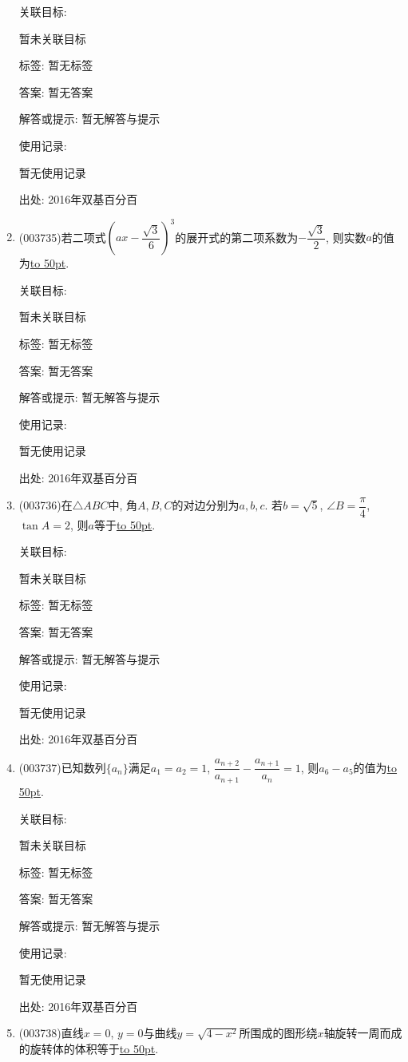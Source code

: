 \documentclass[10pt,a4paper]{article}
\newcommand{\blank}[1]{\underline{\hbox to #1pt{}}}
\begin{document}
\begin{enumerate}[1.]
关联目标:

暂未关联目标



标签: 暂无标签

答案: 暂无答案

解答或提示: 暂无解答与提示

使用记录:

暂无使用记录


出处: 2016年双基百分百
\item { (003735)}若二项式$\left(ax-\dfrac{\sqrt{3}}{6}\right)^3$的展开式的第二项系数为$-\dfrac{\sqrt{3}}{2}$, 则实数$a$的值为\blank{50}.


关联目标:

暂未关联目标



标签: 暂无标签

答案: 暂无答案

解答或提示: 暂无解答与提示

使用记录:

暂无使用记录


出处: 2016年双基百分百
\item { (003736)}在$\triangle ABC$中, 角$A,B,C$的对边分别为$a,b,c$. 若$b=\sqrt{5}$, $\angle B=\dfrac{\pi}{4}$, $\tan A=2$, 则$a$等于\blank{50}.


关联目标:

暂未关联目标



标签: 暂无标签

答案: 暂无答案

解答或提示: 暂无解答与提示

使用记录:

暂无使用记录


出处: 2016年双基百分百
\item { (003737)}已知数列$\{a_n\}$满足$a_1=a_2=1$, $\dfrac{a_{n+2}}{a_{n+1}}-\dfrac{a_{n+1}}{a_n}=1$, 则$a_6-a_5$的值为\blank{50}.


关联目标:

暂未关联目标



标签: 暂无标签

答案: 暂无答案

解答或提示: 暂无解答与提示

使用记录:

暂无使用记录


出处: 2016年双基百分百
\item { (003738)}直线$x=0$, $y=0$与曲线$y=\sqrt{4-x^2}$所围成的图形绕$x$轴旋转一周而成的旋转体的体积等于\blank{50}.



\end{enumerate}
\end{document}
